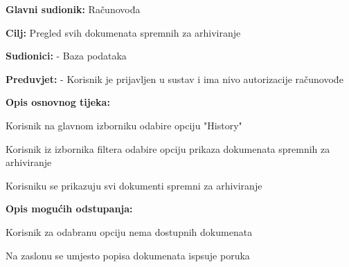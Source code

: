 					\noindent {}
						\begin{packed_item}
		
							\item \textbf{Glavni sudionik:} Računovođa
							\item  \textbf{Cilj:} Pregled svih dokumenata spremnih za arhiviranje
							\item  \textbf{Sudionici:} - Baza podataka
							\item  \textbf{Preduvjet:} - Korisnik je prijavljen u sustav i ima nivo autorizacije računovođe
							\item  \textbf{Opis osnovnog tijeka:}
							
							\item[] \begin{packed_enum}
								\item Korisnik na glavnom izborniku odabire opciju "History"
								\item Korisnik iz izbornika filtera odabire opciju prikaza dokumenata spremnih za arhiviranje
								\item Korisniku se prikazuju svi dokumenti spremni za arhiviranje
							\end{packed_enum}
							
							\item  \textbf{Opis mogućih odstupanja:}
							
							\item[] \begin{packed_item}
		
								\item[3.a]Korisnik za odabranu opciju nema dostupnih dokumenata
								\item[] \begin{packed_enum}
									\item Na zaslonu se umjesto popisa dokumenata ispsuje poruka
								\end{packed_enum}
							\end{packed_item}
						\end{packed_item}

